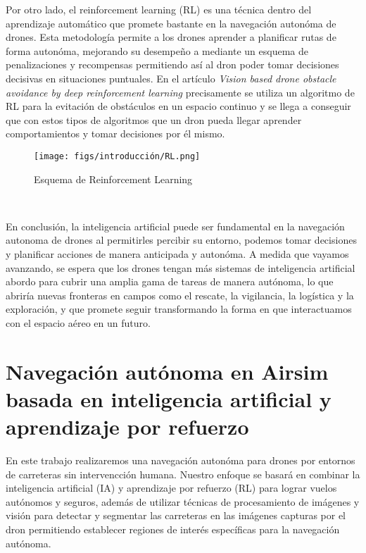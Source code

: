 Por otro lado, el reinforcement learning (RL) \cite{6025669} es una técnica dentro del aprendizaje automático que promete bastante en la navegación autonóma de drones. Esta metodología permite
a los drones aprender a planificar rutas de forma autonóma, mejorando su desempeño a mediante un esquema de penalizaciones y recompensas permitiendo
así al dron poder tomar decisiones decisivas en situaciones puntuales. En el artículo \textit{Vision based drone obstacle avoidance by deep
reinforcement learning} \cite{ai2030023} precisamente se utiliza un algoritmo de RL para la evitación de obstáculos en un espacio continuo y se llega a conseguir que con estos
tipos de algoritmos que un dron pueda llegar aprender comportamientos y tomar decisiones por él mismo. 

\begin{figure} [H]
  \begin{center}
    \texttt{[image: figs/introducción/RL.png]}
  \end{center}
  \caption{Esquema de Reinforcement Learning \cite{BecomingHuman_RL_Basics}}
  \label{fig:Reinforcement Learning}
\end{figure}\



En conclusión, la inteligencia artificial puede ser fundamental en la navegación autonoma de drones al permitirles percibir su entorno, podemos tomar decisiones y planificar acciones 
de manera anticipada y autonóma. A medida que vayamos avanzando, se espera que los drones tengan más sistemas de inteligencia artificial abordo para cubrir una amplia gama de tareas
de manera autónoma, lo que abriría nuevas fronteras en campos como el rescate, la vigilancia, la logística y la exploración, y que promete seguir transformando la forma en que 
interactuamos con el espacio aéreo en un futuro. 

\newpage
\section{Navegación autónoma en Airsim basada en inteligencia artificial y aprendizaje por refuerzo}
\label{sec:Navegación autónoma}

En este trabajo realizaremos una navegación autonóma para drones por entornos de carreteras sin intervencción humana. Nuestro enfoque se basará en 
combinar la inteligencia artificial (IA) y aprendizaje por refuerzo (RL) para lograr vuelos autónomos y seguros, además de utilizar técnicas de procesamiento de imágenes 
y visión para detectar y segmentar las carreteras en las imágenes capturas por el dron permitiendo establecer regiones de interés específicas para la navegación 
autónoma.\newline

